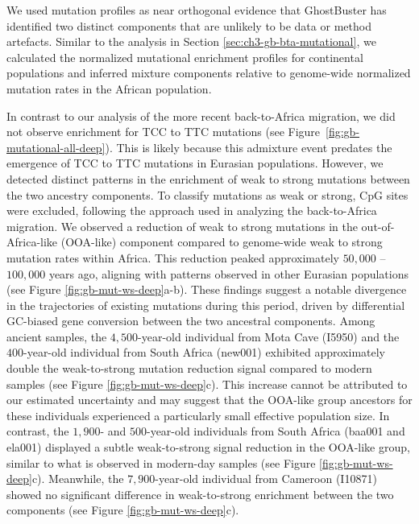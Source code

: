 We used mutation profiles as near orthogonal evidence that GhostBuster has identified two distinct components that are unlikely to be data or method artefacts. Similar to the analysis in Section \ref{sec:ch3-gb-bta-mutational}, we calculated the normalized mutational enrichment profiles for continental populations and inferred mixture components relative to genome-wide normalized mutation rates in the African population.

In contrast to our analysis of the more recent back-to-Africa migration, we did not observe enrichment for TCC to TTC mutations (see Figure~\ref{fig:gb-mutational-all-deep}). This is likely because this admixture event predates the emergence of TCC to TTC mutations in Eurasian populations. However, we detected distinct patterns in the enrichment of weak to strong mutations between the two ancestry components. To classify mutations as weak or strong, CpG sites were excluded, following the approach used in analyzing the back-to-Africa migration. We observed a reduction of weak to strong mutations in the out-of-Africa-like (OOA-like) component compared to genome-wide weak to strong mutation rates within Africa. This reduction peaked approximately $50{,}000$ -- $100{,}000$ years ago, aligning with patterns observed in other Eurasian populations (see Figure \ref{fig:gb-mut-ws-deep}a-b). These findings suggest a notable divergence in the trajectories of existing mutations during this period, driven by differential GC-biased gene conversion between the two ancestral components. Among ancient samples, the $4{,}500$-year-old individual from Mota Cave (I5950) and the $400$-year-old individual from South Africa (new001) exhibited approximately double the weak-to-strong mutation reduction signal compared to modern samples (see Figure \ref{fig:gb-mut-ws-deep}c). This increase cannot be attributed to our estimated uncertainty and may suggest that the OOA-like group ancestors for these individuals experienced a particularly small effective population size. In contrast, the $1{,}900$- and $500$-year-old individuals from South Africa (baa001 and ela001) displayed a subtle weak-to-strong signal reduction in the OOA-like group, similar to what is observed in modern-day samples (see Figure \ref{fig:gb-mut-ws-deep}c). Meanwhile, the $7{,}900$-year-old individual from Cameroon (I10871) showed no significant difference in weak-to-strong enrichment between the two components (see Figure \ref{fig:gb-mut-ws-deep}c).

